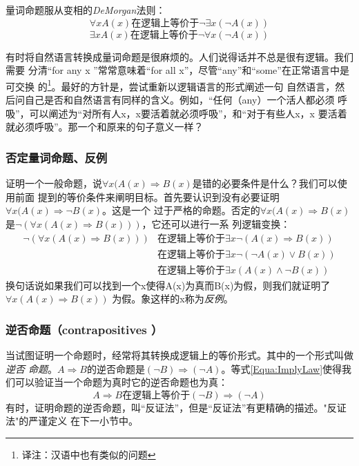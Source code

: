 量词命题服从变相的\emph{DeMorgan}法则：
\begin{equation}
    \forall xA(x) \mbox{在逻辑上等价于} \neg \exists x(\neg A(x))
\end{equation}
\begin{equation}
    \exists xA(x) \mbox{在逻辑上等价于} \neg \forall x(\neg A(x))
\end{equation}

有时将自然语言转换成量词命题是很麻烦的。人们说得话并不总是很有逻辑。我们需要
分清“for any x ”常常意味着“for all
x”，尽管“any”和“some”在正常语言中是可交换
的\footnote{译注：汉语中也有类似的问题}。最好的方针是，尝试重新以逻辑语言的形式阐述一句
自然语言，然后问自己是否和自然语言有同样的含义。例如，“任何（any）一个活人都必须
呼吸”，可以阐述为“对所有人x，x要活着就必须呼吸”，和“对于有些人x，x
要活着就必须呼吸”。那一个和原来的句子意义一样？

\subsubsection{否定量词命题、反例}
证明一个一般命题，说$\forall x(A(x) \Rightarrow
B(x)$是错的必要条件是什么？我们可以使用前面
提到的等价条件来阐明目标。首先要认识到没有必要证明$\forall x(A(x)
\Rightarrow \neg B(x)$。这是一个 过于严格的命题。否定的$\forall
x(A(x) \Rightarrow B(x)$是$\neg(\forall x(A(x) \Rightarrow
B(x)))$，它还可以进行一系 列逻辑变换：
\begin{equation}
    \begin{aligned}
        \neg(\forall x(A(x) \Rightarrow B(x))) &\mbox{在逻辑上等价于} \exists x\neg(A(x)\Rightarrow B(x))\\
        &\mbox{在逻辑上等价于} \exists x\neg(\neg A(x)\vee B(x))\\
        &\mbox{在逻辑上等价于} \exists x(A(x)\wedge \neg B(x))
    \end{aligned}
\end{equation}
换句话说如果我们可以找到一个x使得A(x)为真而B(x)为假，则我们就证明了
$\forall x(A(x)\Rightarrow B(x))$ 为假。象这样的x称为\emph{反例}。

\subsubsection{逆否命题（contrapositives ）}
当试图证明一个命题时，经常将其转换成逻辑上的等价形式。其中的一个形式叫做\emph{逆否
命题}。$A \Rightarrow B$的逆否命题是$(\neg B)\Rightarrow (\neg
A)$。等式\ref{Equa:ImplyLaw}使得我们可以验证当一个命题为真时它的逆否命题也为真：
\begin{equation}
    A \Rightarrow B \mbox{在逻辑上等价于} (\neg B)\Rightarrow (\neg A)
\end{equation}
有时，证明命题的逆否命题，叫“反证法”，但是“反证法”有更精确的描述。"反证法"的严谨定义
在下一小节中。

